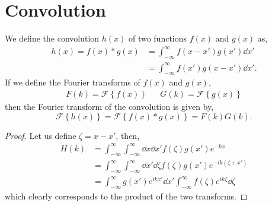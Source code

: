\documentclass{book}
\begin{document}
\section{Convolution}
We define the convolution $h(x)$ of two functions $f(x)$ and $g(x)$ as,
\begin{equation}
	\begin{split}
		h(x) = f(x) * g(x) & = \int_{-\infty}^{\infty}f(x - x')g(x')\dd{x'} \\
		& = \int_{-\infty}^{\infty}f(x')g(x - x')\dd{x'}.
	\end{split}
\end{equation}
If we define the Fourier transforms of $f(x)$ and $g(x)$,
\begin{align}
	F(k) = \mathscr{F}\left\{f(x)\right\} && G(k) = \mathscr{F}\left\{g(x)\right\}
\end{align}
then the Fourier transform of the convolution is given by,
\begin{equation}
	\mathscr{F}\left\{h(x)\right\} = \mathscr{F}\left\{f(x) * g(x)\right\} = F(k)G(k).
\end{equation}
\begin{proof}
	Let us define $\zeta = x - x'$, then,
	\begin{equation}
		\begin{split}
			H(k) & = \int_{-\infty}^{\infty}\int_{-\infty}^{\infty}\dd{x}\dd{x'}f(\zeta)g(x')e^{-kx} \\
			& = \int_{-\infty}^{\infty}\int_{-\infty}^{\infty} \dd{x'}\dd{\zeta}f(\zeta)g(x')e^{-ik(\zeta+x')} \\
			& = \int_{-\infty}^{\infty}g(x')e^{ikx'}\dd{x'}\int_{-\infty}^{\infty}f(\zeta)e^{ik\zeta}\dd{\zeta}
		\end{split}
	\end{equation}
	which clearly corresponds to the product of the two transforms.
\end{proof}
\end{document}
